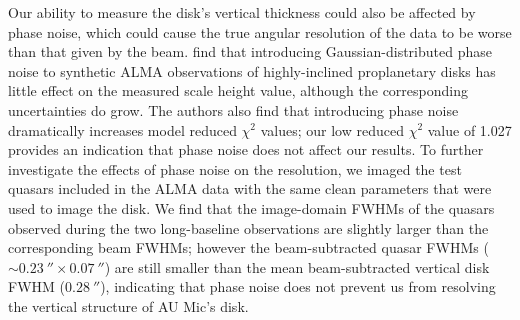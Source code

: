 \documentclass[modern]{aastex62}
\begin{document}
Our ability to measure the disk's vertical thickness could also be affected by phase noise, which could cause the true angular resolution of the data to
%
be worse than 
that given by the beam.
\citet{boehler13} find that introducing Gaussian-distributed phase noise to synthetic ALMA observations of highly-inclined proplanetary disks has little effect on the measured scale height value, although the corresponding uncertainties do grow.
The authors also find that introducing phase noise dramatically increases model reduced $\chi^2$ values; our low reduced $\chi^2$ value of 1.027 provides an indication that phase noise does not affect our results.
To further investigate the effects of phase noise on the resolution, we imaged the test quasars included in the ALMA data with the same clean parameters that were used to image the disk.
We find that the image-domain FWHMs of the quasars observed during the two long-baseline observations are slightly larger than the corresponding beam FWHMs; however the beam-subtracted quasar FWHMs ($\sim \SI{0.23}{\arcsecond} \times \SI{0.07}{\arcsecond}$) are still smaller than the mean beam-subtracted vertical disk FWHM
($\SI{0.28}{\arcsecond}$), indicating that phase noise does not prevent us from resolving the vertical structure of AU Mic's disk.
\end{document}
